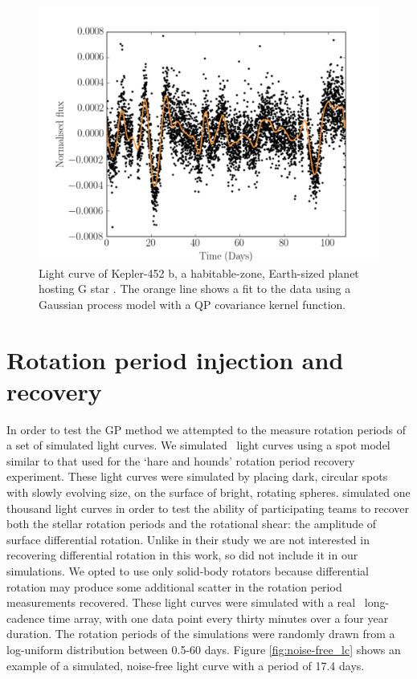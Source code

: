 \begin{figure}
\begin{center}
\includegraphics[width=6in, clip=true]{figures/Kepler452b.pdf}
\caption[A light curve with a GP model.]
{Light curve of Kepler-452 b, a habitable-zone, Earth-sized planet
hosting G star \citep{Jenkins2015}. The orange line shows a fit to the data using
a Gaussian process model with a QP covariance kernel function.}
\label{fig:GP_example}
\end{center}
\end{figure}

\section{Rotation period injection and recovery}

In order to test the GP method we attempted to the measure rotation periods of
a set of simulated light curves.
We simulated \nlightcurves\ light curves using a spot model similar to that
used
for the \citet{Aigrain2015} `hare and hounds' rotation period recovery
experiment.
These light curves were simulated by placing dark, circular spots with slowly
evolving size, on the surface of bright, rotating spheres.
\citet{Aigrain2015} simulated one thousand light curves in order to test the
ability of participating teams to recover both the stellar rotation periods
and the rotational shear: the amplitude of surface differential rotation.
Unlike in their study we are not interested in recovering differential
rotation in this work, so did not include it in our simulations.
We opted to use only solid-body rotators because differential rotation may
produce some additional scatter in the rotation period measurements recovered.
These light curves were simulated with a real \Kepler\ long-cadence time
array, with one data point every thirty minutes over a four year duration.
The rotation periods of the simulations were randomly drawn from a log-uniform
distribution between 0.5-60 days.
Figure \ref{fig:noise-free_lc} shows an example of a simulated, noise-free
light curve with a period of 17.4 days.

